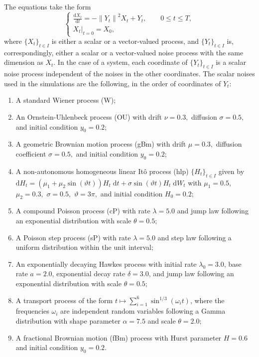 \documentclass[reqno,12pt]{amsart}
\theoremstyle{plain} %
\theoremstyle{definition} %
\begin{document}
The equations take the form
\begin{equation}
    \label{supp:allnoisesRODEsystem}
    \begin{cases}
        \displaystyle \frac{\mathrm{d}{X}_t}{\mathrm{d} t} = - \left\|{Y}_t\right\|^2 {X}_t + {Y}_t, \qquad 0 \leq t \leq T, \\
        \left. {X}_t \right|_{t = 0} = {X}_0,
    \end{cases}
\end{equation}
where $\{X_t\}_{t\in I}$ is either a scalar or a vector-valued process, and $\{Y_t\}_{t\in I}$ is, correspondingly, either a scalar or a vector-valued noise process with the same dimension as ${X}_t$. In the case of a system, each coordinate of $\{Y_t\}_{t\in I}$ is a scalar noise process independent of the noises in the other coordinates. The scalar noises used in the simulations are the following, in the order of coordinates of $Y_t$:
\begin{enumerate}
    \item A standard Wiener process (W);
    \item An Ornstein-Uhlenbeck process (OU) with drift $\nu = 0.3,$ diffusion $\sigma = 0.5,$ and initial condition $y_0 = 0.2$;
    \item A geometric Brownian motion process (gBm) with drift $\mu = 0.3,$ diffusion coefficient $\sigma = 0.5,$ and initial condition $y_0 = 0.2$;
    \item A non-autonomous homogeneous linear It\^o process (hlp) $\{H_t\}_{t\in I}$ given by $\mathrm{d}H_t = (\mu_1 + \mu_2\sin(\vartheta t))H_t\;\mathrm{d}t + \sigma\sin(\vartheta t)H_t\;\mathrm{d}W_t$ with $\mu_1 = 0.5,$ $\mu_2 = 0.3,$ $\sigma = 0.5,$ $\vartheta=3\pi,$ and initial condition $H_0 = 0.2;$
    \item A compound Poisson process (cP) with rate $\lambda = 5.0$ and jump law following an exponential distribution with scale $\theta = 0.5;$
    \item A Poisson step process (sP) with rate $\lambda = 5.0$ and step law following a uniform distribution within the unit interval;
    \item An exponentially decaying Hawkes process with initial rate $\lambda_0 = 3.0$, base rate $a = 2.0$, exponential decay rate $\delta = 3.0$, and jump law following an exponential distribution with scale $\theta = 0.5;$
    \item A transport process of the form $t \mapsto \sum_{i=1}^{6} \sin^{1/3}(\omega_i t)$, where the frequencies $\omega_i$ are independent random variables following a Gamma distribution with shape parameter $\alpha = 7.5$ and scale $\theta = 2.0;$
    \item A fractional Brownian motion (fBm) process with Hurst parameter $H=0.6$ and initial condition $y_0 = 0.2$.
\end{enumerate}
\end{document}
